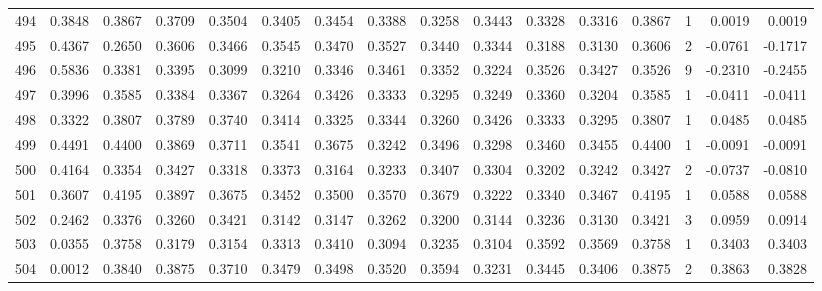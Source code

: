 \begin{tabular}{lrrrrrrrrrrrrrrr}
494 &      0.3848 &  0.3867 &  0.3709 &  0.3504 &  0.3405 &  0.3454 &  0.3388 &  0.3258 &  0.3443 &  0.3328 &   0.3316 &     0.3867 &      1 &                    0.0019 &                     0.0019 \\
495 &      0.4367 &  0.2650 &  0.3606 &  0.3466 &  0.3545 &  0.3470 &  0.3527 &  0.3440 &  0.3344 &  0.3188 &   0.3130 &     0.3606 &      2 &                   -0.0761 &                    -0.1717 \\
496 &      0.5836 &  0.3381 &  0.3395 &  0.3099 &  0.3210 &  0.3346 &  0.3461 &  0.3352 &  0.3224 &  0.3526 &   0.3427 &     0.3526 &      9 &                   -0.2310 &                    -0.2455 \\
497 &      0.3996 &  0.3585 &  0.3384 &  0.3367 &  0.3264 &  0.3426 &  0.3333 &  0.3295 &  0.3249 &  0.3360 &   0.3204 &     0.3585 &      1 &                   -0.0411 &                    -0.0411 \\
498 &      0.3322 &  0.3807 &  0.3789 &  0.3740 &  0.3414 &  0.3325 &  0.3344 &  0.3260 &  0.3426 &  0.3333 &   0.3295 &     0.3807 &      1 &                    0.0485 &                     0.0485 \\
499 &      0.4491 &  0.4400 &  0.3869 &  0.3711 &  0.3541 &  0.3675 &  0.3242 &  0.3496 &  0.3298 &  0.3460 &   0.3455 &     0.4400 &      1 &                   -0.0091 &                    -0.0091 \\
500 &      0.4164 &  0.3354 &  0.3427 &  0.3318 &  0.3373 &  0.3164 &  0.3233 &  0.3407 &  0.3304 &  0.3202 &   0.3242 &     0.3427 &      2 &                   -0.0737 &                    -0.0810 \\
501 &      0.3607 &  0.4195 &  0.3897 &  0.3675 &  0.3452 &  0.3500 &  0.3570 &  0.3679 &  0.3222 &  0.3340 &   0.3467 &     0.4195 &      1 &                    0.0588 &                     0.0588 \\
502 &      0.2462 &  0.3376 &  0.3260 &  0.3421 &  0.3142 &  0.3147 &  0.3262 &  0.3200 &  0.3144 &  0.3236 &   0.3130 &     0.3421 &      3 &                    0.0959 &                     0.0914 \\
503 &      0.0355 &  0.3758 &  0.3179 &  0.3154 &  0.3313 &  0.3410 &  0.3094 &  0.3235 &  0.3104 &  0.3592 &   0.3569 &     0.3758 &      1 &                    0.3403 &                     0.3403 \\
504 &      0.0012 &  0.3840 &  0.3875 &  0.3710 &  0.3479 &  0.3498 &  0.3520 &  0.3594 &  0.3231 &  0.3445 &   0.3406 &     0.3875 &      2 &                    0.3863 &                     0.3828 \\

\end{tabular}
